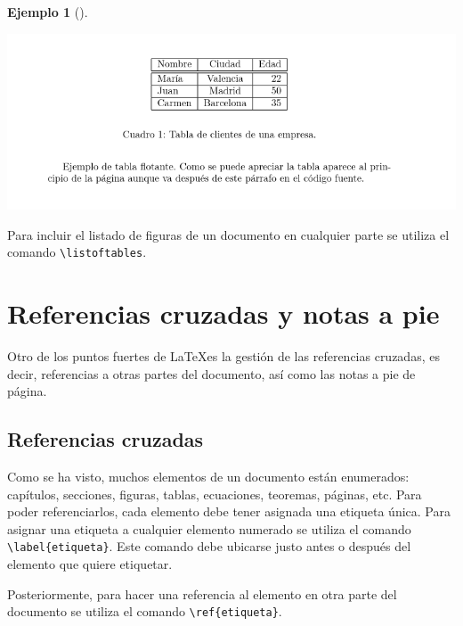 \documentclass[
  a4paper,
]{scrreport}
\theoremstyle{definition}
\newtheorem{example}{Ejemplo}[chapter]
\theoremstyle{remark}
\begin{document}
\begin{example}[]
\begin{tcolorbox}
\includegraphics{img/entornos-flotantes/tabla-flotante.png}

\end{tcolorbox}

\end{example}

Para incluir el listado de figuras de un documento en cualquier parte se
utiliza el comando \texttt{\textbackslash{}listoftables}.


\chapter{Referencias cruzadas y notas a
pie}\label{referencias-cruzadas-y-notas-a-pie}

Otro de los puntos fuertes de \LaTeX es la gestión de las referencias
cruzadas, es decir, referencias a otras partes del documento, así como
las notas a pie de página.

\section{Referencias cruzadas}\label{referencias-cruzadas}

Como se ha visto, muchos elementos de un documento están enumerados:
capítulos, secciones, figuras, tablas, ecuaciones, teoremas, páginas,
etc. Para poder referenciarlos, cada elemento debe tener asignada una
etiqueta única. Para asignar una etiqueta a cualquier elemento numerado
se utiliza el comando \texttt{\textbackslash{}label\{etiqueta\}}. Este
comando debe ubicarse justo antes o después del elemento que quiere
etiquetar.

Posteriormente, para hacer una referencia al elemento en otra parte del
documento se utiliza el comando
\texttt{\textbackslash{}ref\{etiqueta\}}.
\end{document}
